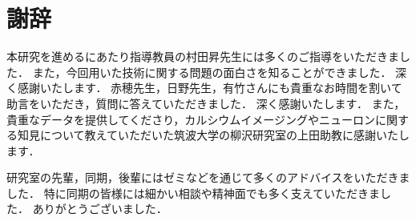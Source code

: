 \chapter*{謝辞}
本研究を進めるにあたり指導教員の村田昇先生には多くのご指導をいただきました．
また，今回用いた技術に関する問題の面白さを知ることができました．
深く感謝いたします．
赤穂先生，日野先生，有竹さんにも貴重なお時間を割いて助言をいただき，質問に答えていただきました．
深く感謝いたします．
また，貴重なデータを提供してくださり，カルシウムイメージングやニューロンに関する知見について教えていただいた筑波大学の柳沢研究室の上田助教に感謝いたします．

研究室の先輩，同期，後輩にはゼミなどを通じて多くのアドバイスをいただきました．
特に同期の皆様には細かい相談や精神面でも多く支えていただきました．
ありがとうございました．
